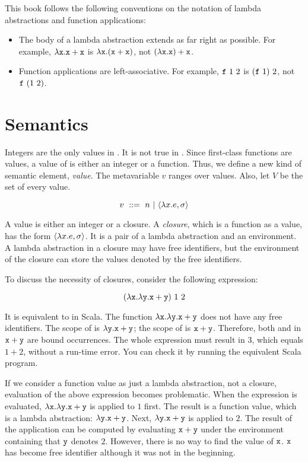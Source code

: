 This book follows the following conventions on the notation of lambda
abstractions and function applications:

\begin{itemize}
  \item The body of a lambda abstraction extends as far right as possible. For
    example, $\lambda\texttt{x}.\texttt{x}+\texttt{x}$ is $\lambda\texttt{x}.(\texttt{x}+\texttt{x})$,
    not $(\lambda\texttt{x}.\texttt{x})+\texttt{x}$.
  \item Function applications are left-associative. For example,
    $\texttt{f}\ 1\ 2$ is $(\texttt{f}\ 1)\ 2$, not
    $\texttt{f}\ (1\ 2)$.
\end{itemize}

\section{Semantics}

Integers are the only values in \plang. It is not true in \Lang. Since
first-class functions are values, a value of \Lang is either an integer or a
function. Thus, we define a new kind of semantic element,
\textit{value}. The
metavariable $v$ ranges over values. Also, let $V$ be the set of every value.

\[ v\ ::=\ n\ |\ \clov{x}{e}{\sigma} \]

A value is either an integer or a closure. A \textit{closure}, which is a
function as a value, has the form $\langle\lambda x.e,\sigma\rangle$.
It is a pair of a lambda abstraction and an environment.
A lambda abstraction in a closure may have free identifiers,
but the environment of the closure can store the values denoted by the
free identifiers.

To discuss the necessity of closures, consider the following expression:

\[(\lambda\texttt{x}.\lambda\texttt{y}.\texttt{x}+\texttt{y})\ 1\ 2\]

It is equivalent to  in Scala.
The function $\lambda\texttt{x}.\lambda\texttt{y}.\texttt{x}+\texttt{y}$ does not have any free
identifiers. The scope of  is ${\lambda\texttt{y}.\texttt{x}+\texttt{y}}$; the scope
of  is ${\texttt{x}+\texttt{y}}$. Therefore, both  and  in
$\texttt{x}+\texttt{y}$ are bound occurrences. The whole expression must result in $3$,
which equals $1+2$, without a run-time error. You can check it by running the
equivalent Scala program.

If we consider a function value as just a lambda abstraction, not a closure,
evaluation of the above expression becomes problematic.
When the expression is evaluated, $\lambda\texttt{x}.\lambda\texttt{y}.\texttt{x}+\texttt{y}$ is
applied to $1$ first. The result is a function value, which is a lambda
abstraction: $\lambda\texttt{y}.\texttt{x}+\texttt{y}$. Next, $\lambda\texttt{y}.\texttt{x}+\texttt{y}$
is applied to $2$. The result of the application can be computed by evaluating
$\texttt{x}+\texttt{y}$ under the environment containing that $\texttt{y}$ denotes $2$.
However, there is no way to find the value of $\texttt{x}$. $\texttt{x}$ has become free
identifier although it was not in the beginning.

